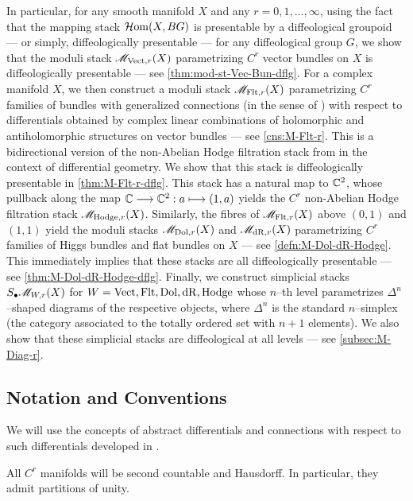 \documentclass[11pt]{amsart}
\begin{document}
In particular, for any smooth manifold $X$ and any $r = 0, 1, \dots, \infty$, using the fact that
the mapping stack $\mathcal{H}\mathrm{om}(X, BG)$ is presentable by a diffeological groupoid --- or simply,
diffeologically presentable --- for any diffeological group $G$,
we show that the moduli stack $\mathscr{M}_{\mathrm{Vect}, r}(X)$ parametrizing $C^r$ vector bundles on $X$
is diffeologically presentable --- see \cref{thm:mod-st-Vec-Bun-dflg}.
For a complex manifold $X$, we then construct a moduli stack $\mathscr{M}_{\mathrm{Flt}, r}(X)$ parametrizing $C^r$
families of bundles with generalized connections (in the sense of \cite[\S 2]{AR26a}) with respect
to differentials
obtained by complex linear combinations of holomorphic and antiholomorphic structures on vector
bundles --- see \cref{cns:M-Flt-r}.
This is a bidirectional version of the non-Abelian Hodge filtration stack from
\cite[\S 10]{NonAbHodgeFilt} in the context of differential geometry.
We show that this stack is diffeologically presentable in \cref{thm:M-Flt-r-dflg}.
This stack has a natural map to $\mathbb{C}^2$, whose
pullback along the map $\bC \to \bC^2 : a \mapsto (1, a)$
yields the $C^r$ non-Abelian Hodge filtration stack $\mathscr{M}_{\mathrm{Hodge}, r}(X)$.
Similarly, the fibres of $\mathscr{M}_{\mathrm{Flt}, r}(X)$ above
$(0, 1)$ and $(1, 1)$ yield the moduli stacks
$\mathscr{M}_{\mathrm{Dol}, r}(X)$ and $\mathscr{M}_{\mathrm{dR}, r}(X)$ parametrizing $C^r$ families of Higgs bundles and flat
bundles on $X$ --- see \cref{defn:M-Dol-dR-Hodge}.
This immediately implies that these stacks are all diffeologically presentable --- see
\cref{thm:M-Dol-dR-Hodge-dflg}.
Finally, we construct simplicial stacks $S_\bullet\mathscr{M}_{W, r}(X)$ for
$W = \mathrm{Vect}, \mathrm{Flt}, \mathrm{Dol}, \mathrm{dR}, \mathrm{Hodge}$ whose $n$--th level parametrizes $\Delta^n$--shaped diagrams
of the respective objects, where $\Delta^n$ is the standard $n$--simplex (the category associated to
the totally ordered set with $n + 1$ elements). We also show that these simplicial stacks
are diffeological at all levels --- see \cref{subsec:M-Diag-r}.

\subsection{Notation and Conventions}

We will use the concepts of abstract differentials and connections with respect to such
differentials developed in \cites{GR15, AR26a}.

\begin{conv}
All $C^r$ manifolds will be second countable and Hausdorff. In particular, they admit partitions
of unity.
\end{conv}
\end{document}
